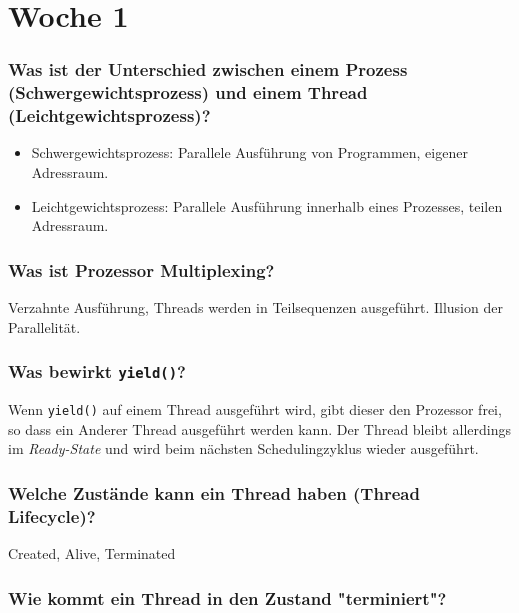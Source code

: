\documentclass[10pt,a4paper]{scrartcl}
\begin{document}
\setcounter{secnumdepth}{0}
\tableofcontents

\newpage

\section{Woche 1}

\subsubsection{Was ist der Unterschied zwischen einem Prozess (Schwergewichtsprozess) und einem
Thread (Leichtgewichtsprozess)?}

\begin{itemize}
	\item Schwergewichtsprozess: Parallele Ausführung von Programmen, eigener Adressraum.
	\item Leichtgewichtsprozess: Parallele Ausführung innerhalb eines Prozesses, teilen Adressraum.
\end{itemize}

\subsubsection{Was ist Prozessor Multiplexing?}

Verzahnte Ausführung, Threads werden in Teilsequenzen ausgeführt. Illusion der Parallelität.
   
\subsubsection{Was bewirkt \texttt{yield()}?}

Wenn \texttt{yield()} auf einem Thread ausgeführt wird, gibt dieser den Prozessor frei, so dass ein
Anderer Thread ausgeführt werden kann. Der Thread bleibt allerdings im \textit{Ready-State} und wird beim
nächsten Schedulingzyklus wieder ausgeführt.

\subsubsection{Welche Zustände kann ein Thread haben (Thread Lifecycle)?}

Created, Alive, Terminated

\subsubsection{Wie kommt ein Thread in den Zustand "terminiert"?}
\end{document}
